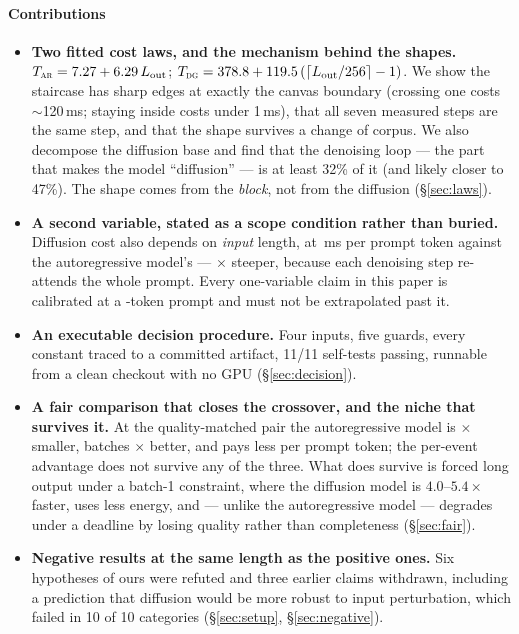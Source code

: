 \paragraph{Contributions}
\begin{itemize}
  \item \textbf{Two fitted cost laws, and the mechanism behind the shapes.}
    $T_{\textsc{ar}} = 7.27 + 6.29\,L_{\mathrm{out}}$;
    $T_{\textsc{dg}} = 378.8 + 119.5\,(\lceil
    L_{\mathrm{out}}/256\rceil - 1)$. We show the staircase has
    sharp edges at exactly the canvas boundary (crossing one costs
    $\sim$120\,ms; staying inside costs under 1\,ms), that all seven measured
    steps are the same step, and that the shape survives a change of corpus.
    We also decompose the diffusion base and find that the denoising loop ---
    the part that makes the model ``diffusion'' --- is at least 32\% of it (and
    likely closer to 47\%). The shape comes from the \emph{block}, not from the
    diffusion (\S\ref{sec:laws}).
  \item \textbf{A second variable, stated as a scope condition rather than
    buried.} Diffusion cost also depends on \emph{input} length, at
    \dgInputSlope\,ms per prompt token against the autoregressive model's
    \arInputSlope{} --- $\times$ steeper, because each denoising
    step re-attends the whole prompt. Every one-variable claim in this paper is
    calibrated at a -token prompt and must not be extrapolated past
    it.
  \item \textbf{An executable decision procedure.} Four inputs, five guards,
    every constant traced to a committed artifact, 11/11 self-tests passing,
    runnable from a clean checkout with no GPU (\S\ref{sec:decision}).
  \item \textbf{A fair comparison that closes the crossover, and the niche
    that survives it.} At the quality-matched pair the autoregressive model is
    \footprintRatio$\times$ smaller, batches \arBatchMult$\times$ better, and
    pays less per prompt token; the per-event advantage does not survive any
    of the three. What does survive is forced long output under a batch-1
    constraint, where the diffusion model is $4.0$--$5.4\times$ faster, uses
    less energy, and --- unlike the autoregressive model --- degrades under a
    deadline by losing quality rather than completeness (\S\ref{sec:fair}).
  \item \textbf{Negative results at the same length as the positive ones.} Six
    hypotheses of ours were refuted and three earlier claims withdrawn,
    including a prediction that diffusion would be more robust to input
    perturbation, which failed in 10 of 10 categories
    (\S\ref{sec:setup}, \S\ref{sec:negative}).
\end{itemize}

